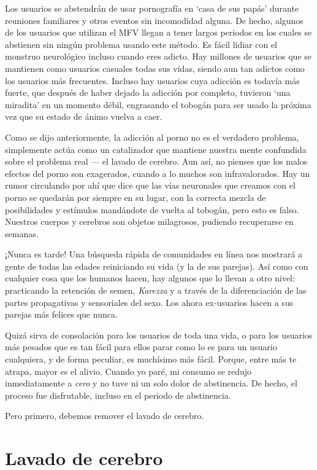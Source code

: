 \documentclass[
  spanish,
  openany]{book}
\begin{document}
Los usuarios se abstendrán de usar pornografía en `casa de sus papás' durante reuniones familiares y otros eventos sin incomodidad alguna. De hecho, algunos de los usuarios que utilizan el MFV llegan a tener largos periodos en los cuales se abstienen sin ningún problema usando este método. Es fácil lidiar con el monstruo neurológico incluso cuando eres adicto. Hay millones de usuarios que se mantienen como usuarios casuales todas sus vidas, siendo aun tan adictos como los usuarios más frecuentes. Incluso hay usuarios cuya adicción es todavía más fuerte, que después de haber dejado la adicción por completo, tuvieron `una miradita' en un momento débil, engrasando el tobogán para ser usado la próxima vez que su estado de ánimo vuelva a caer.

Como se dijo anteriormente, la adicción al porno no es el verdadero problema, simplemente actúa como un catalizador que mantiene nuestra mente confundida sobre el problema real --- el lavado de cerebro. Aun así, no pienses que los malos efectos del porno son exagerados, cuando a lo muchos son infravalorados. Hay un rumor circulando por ahí que dice que las vías neuronales que creamos con el porno se quedarán por siempre en su lugar, con la correcta mezcla de posibilidades y estímulos mandándote de vuelta al tobogán, pero esto es falso. Nuestros cuerpos y cerebros son objetos milagrosos, pudiendo recuperarse en semanas.

¡Nunca es tarde! Una búsqueda rápida de comunidades en línea nos mostrará a gente de todas las edades reiniciando su vida (y la de sus parejas). Así como con cualquier cosa que los humanos hacen, hay algunos que lo llevan a otro nivel: practicando la retención de semen, \emph{Karezza} y a través de la diferenciación de las partes propagativas y sensoriales del sexo. Los ahora ex-usuarios hacen a sus parejas más felices que nunca.

Quizá sirva de consolación para los usuarios de toda una vida, o para los usuarios más pesados que es tan fácil para ellos parar como lo es para un usuario cualquiera, y de forma peculiar, es muchísimo más fácil. Porque, entre más te atrapa, mayor es el alivio. Cuando yo paré, mi consumo se redujo inmediatamente a \emph{cero} y no tuve ni un solo dolor de abstinencia. De hecho, el proceso fue disfrutable, incluso en el periodo de abstinencia.

Pero primero, debemos remover el lavado de cerebro.

\hypertarget{lavado-de-cerebro}{%
\chapter{Lavado de cerebro}\label{lavado-de-cerebro}}
\end{document}
